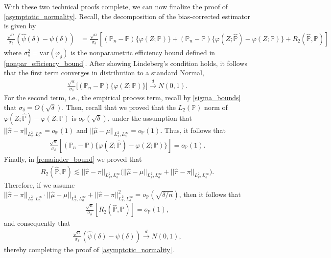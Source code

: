 \documentclass[11pt,twoside]{article}
\newcommand{\var}{\text{var}}
\theoremstyle{definition}
\theoremstyle{remark}
\begin{document}
With these two technical proofs complete, we can now finalize the proof of \cref{asymptotic_normality}. Recall, the decomposition of the bias-corrected estimator is given by
\begin{align*}
   \frac{\sqrt{n}}{\sigma_\delta}\left(\widehat{\psi}(\delta) - \psi(\delta)\right) &= \frac{\sqrt{n}}{\sigma_\delta} \left[(\mathbb{P}_n - \mathbb{P})\{\varphi(Z; \mathbb{P})\} + (\mathbb{P}_n - \mathbb{P})\{\varphi(Z; \widehat{\mathbb{P}}) - \varphi(Z; \mathbb{P})\} + R_2(\widehat{\mathbb{P}}, \mathbb{P}) \right]
\end{align*}
where $\sigma^2_\delta = \var(\varphi_\delta)$ is the nonparametric efficiency bound defined in \cref{nonpar_efficiency_bound}. After showing Lindeberg's condition holds, it follows that the first term converges in distribution to a standard Normal,
\begin{align*}
    \frac{\sqrt{n}}{\sigma_\delta} \Big[(\mathbb{P}_n - \mathbb{P})\{\varphi(Z; \mathbb{P})\} \Big] \overset{d}{\longrightarrow} N(0, 1).
\end{align*}
For the second term, i.e., the empirical process term, recall by \cref{sigma_bounds} that $\sigma_\delta = O(\sqrt{\delta})$. Then, recall that we proved that the $L_2(\mathbb{P})$ norm of  $\varphi(Z; \widehat{\mathbb{P}}) - \varphi(Z; \mathbb{P})$ is $o_\mathbb{P}(\sqrt{\delta})$, under the assumption that $|| \widehat{\pi} - \pi||_{L^2_x, L^\infty_a} = o_\mathbb{P}(1)$ and $ || \widehat{\mu} - \mu ||_{L^2_x, L^\infty_a} = o_\mathbb{P}(1)$. Thus, it follows that
\begin{align*}
    \frac{\sqrt{n}}{\sigma_\delta} \left[(\mathbb{P}_n - \mathbb{P})\{\varphi(Z; \widehat{\mathbb{P}}) - \varphi(Z; \mathbb{P})\} \right] = o_{\mathbb{P}}(1).
\end{align*}
Finally, in \cref{remainder_bound} we proved that  
\begin{align*}
       R_2(\widehat{\mathbb{P}}, \mathbb{P}) \lesssim  || \widehat{\pi} - \pi||_{L^2_x, L^\infty_a} \Big(  || \widehat{\mu} - \mu ||_{L^2_x, L^\infty_a}  +  || \widehat{\pi} - \pi||_{L^2_x, L^\infty_a} \Big).
 \end{align*}
Therefore, if we assume $ || \widehat{\pi} - \pi||_{L^2_x, L^\infty_a} \cdot   || \widehat{\mu} - \mu ||_{L^2_x, L^\infty_a}  +  || \widehat{\pi} - \pi||^2_{L^2_x, L^\infty_a} = o_{\mathbb{P}}(\sqrt{\delta / n})$, then it follows that
\begin{align*}
    \frac{\sqrt{n}}{\sigma_\delta} \left[R_2(\widehat{\mathbb{P}}, \mathbb{P}) \right] = o_{\mathbb{P}}(1),
\end{align*}
and consequently that
\begin{align*}
    \frac{\sqrt{n}}{\sigma_\delta}\left(\widehat{\psi}(\delta) - \psi(\delta)\right)\overset{d}{\longrightarrow}N(0,1),
\end{align*}
thereby completing the proof of \cref{asymptotic_normality}.
\end{document}
